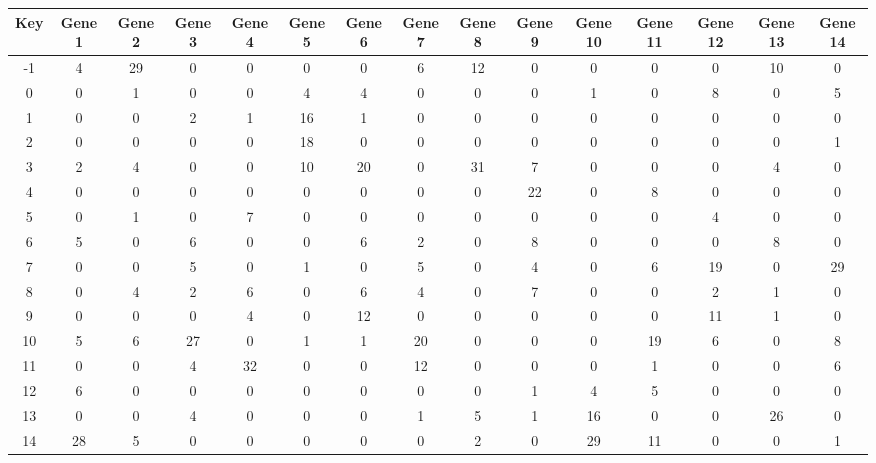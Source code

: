 \begin{tabular}{|c|c|c|c|c|c|c|c|c|c|c|c|c|c|c|}
\hline
Key & Gene 1 & Gene 2 & Gene 3 & Gene 4 & Gene 5 & Gene 6 & Gene 7 & Gene 8 & Gene 9 & Gene 10 & Gene 11 & Gene 12 & Gene 13 & Gene 14 \\
\hline
-1 & 4 & 29 & 0 & 0 & 0 & 0 & 6 & 12 & 0 & 0 & 0 & 0 & 10 & 0 \\
0 & 0 & 1 & 0 & 0 & 4 & 4 & 0 & 0 & 0 & 1 & 0 & 8 & 0 & 5 \\
1 & 0 & 0 & 2 & 1 & 16 & 1 & 0 & 0 & 0 & 0 & 0 & 0 & 0 & 0 \\
2 & 0 & 0 & 0 & 0 & 18 & 0 & 0 & 0 & 0 & 0 & 0 & 0 & 0 & 1 \\
3 & 2 & 4 & 0 & 0 & 10 & 20 & 0 & 31 & 7 & 0 & 0 & 0 & 4 & 0 \\
4 & 0 & 0 & 0 & 0 & 0 & 0 & 0 & 0 & 22 & 0 & 8 & 0 & 0 & 0 \\
5 & 0 & 1 & 0 & 7 & 0 & 0 & 0 & 0 & 0 & 0 & 0 & 4 & 0 & 0 \\
6 & 5 & 0 & 6 & 0 & 0 & 6 & 2 & 0 & 8 & 0 & 0 & 0 & 8 & 0 \\
7 & 0 & 0 & 5 & 0 & 1 & 0 & 5 & 0 & 4 & 0 & 6 & 19 & 0 & 29 \\
8 & 0 & 4 & 2 & 6 & 0 & 6 & 4 & 0 & 7 & 0 & 0 & 2 & 1 & 0 \\
9 & 0 & 0 & 0 & 4 & 0 & 12 & 0 & 0 & 0 & 0 & 0 & 11 & 1 & 0 \\
10 & 5 & 6 & 27 & 0 & 1 & 1 & 20 & 0 & 0 & 0 & 19 & 6 & 0 & 8 \\
11 & 0 & 0 & 4 & 32 & 0 & 0 & 12 & 0 & 0 & 0 & 1 & 0 & 0 & 6 \\
12 & 6 & 0 & 0 & 0 & 0 & 0 & 0 & 0 & 1 & 4 & 5 & 0 & 0 & 0 \\
13 & 0 & 0 & 4 & 0 & 0 & 0 & 1 & 5 & 1 & 16 & 0 & 0 & 26 & 0 \\
14 & 28 & 5 & 0 & 0 & 0 & 0 & 0 & 2 & 0 & 29 & 11 & 0 & 0 & 1 \\
\hline
\end{tabular}